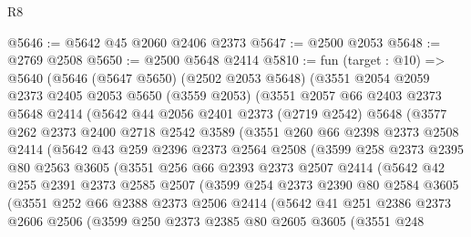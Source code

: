 \begin{lexlean}{R8}
\begin{coremodule}
@5646 := @5642 @45 @2060 @2406 @2373
@5647 := @2500 @2053
@5648 := @2769 @2508
@5650 := @2500 @5648 @2414
@5810 := fun (target : @10) =>
  @5640
    (@5646
      (@5647 @5650)
      (@2502 @2053 @5648)
      (@3551
        @2054
        @2059
        @2373
        @2405
        @2053
        @5650
        (@3559 @2053)
        (@3551
          @2057
          @66
          @2403
          @2373
          @5648
          @2414
          (@5642
            @44
            @2056
            @2401
            @2373
            (@2719 @2542)
            @5648
            (@3577
              @262
              @2373
              @2400
              @2718
              @2542
              @3589
              (@3551
                @260
                @66
                @2398
                @2373
                @2508
                @2414
                (@5642
                  @43
                  @259
                  @2396
                  @2373
                  @2564
                  @2508
                  (@3599
                    @258
                    @2373
                    @2395
                    @80
                    @2563
                    @3605
                    (@3551
                      @256
                      @66
                      @2393
                      @2373
                      @2507
                      @2414
                      (@5642
                        @42
                        @255
                        @2391
                        @2373
                        @2585
                        @2507
                        (@3599
                          @254
                          @2373
                          @2390
                          @80
                          @2584
                          @3605
                          (@3551
                            @252
                            @66
                            @2388
                            @2373
                            @2506
                            @2414
                            (@5642
                              @41
                              @251
                              @2386
                              @2373
                              @2606
                              @2506
                              (@3599
                                @250
                                @2373
                                @2385
                                @80
                                @2605
                                @3605
                                (@3551
                                  @248

\end{coremodule}
\end{lexlean}

